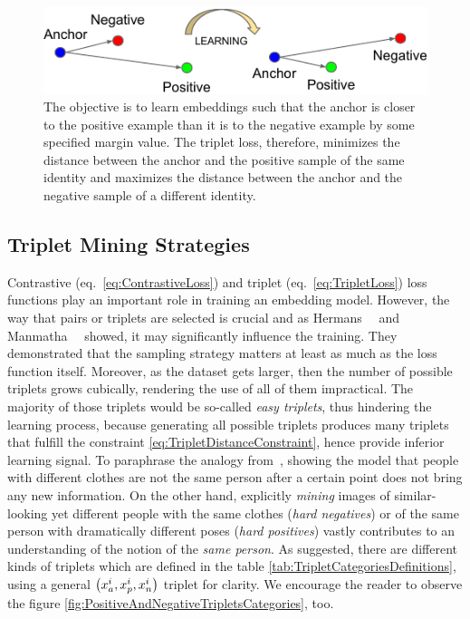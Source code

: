 \begin{figure}[t]
    \centerline{\includegraphics[width=0.6\linewidth]{figures/theoretical_foundations/triplet_loss_learning_process.pdf}}
    \caption[Triplet loss learning]{The objective is to learn embeddings such that the anchor is closer to the positive example than it is to the negative example by some specified margin value. The triplet loss, therefore, minimizes the distance between the anchor and the positive sample of the same identity and maximizes the distance between the anchor and the negative sample of a different identity. }
    \label{fig:TripletLossLearningProcess}
\end{figure}

\subsection{Triplet Mining Strategies}
\label{ssec:TripletMiningStrategies}

Contrastive (eq.~\ref{eq:ContrastiveLoss}) and triplet (eq.~\ref{eq:TripletLoss}) loss functions play an important role in training an embedding model. However, the way that pairs or triplets are selected is crucial and as Hermans~\etal{}~\cite{hermans2017triplet} and Manmatha~\etal{}~\cite{manmatha2017samplingmatters} showed, it may significantly influence the training. They demonstrated that the sampling strategy matters at least as much as the loss function itself. Moreover, as the dataset gets larger, then the number of possible triplets grows cubically, rendering the use of all of them impractical. The majority of those triplets would be so-called \emph{easy triplets}, thus hindering the learning process, because generating all possible triplets produces many triplets that fulfill the constraint \ref{eq:TripletDistanceConstraint}, hence provide inferior learning signal. To paraphrase the analogy from~\cite{hermans2017triplet}, showing the model that people with different clothes are not the same person after a certain point does not bring any new information. On the other hand, explicitly \emph{mining} images of similar-looking yet different people with the same clothes (\emph{hard negatives}) or of the same person with dramatically different poses (\emph{hard positives}) vastly contributes to an understanding of the notion of the \emph{same person}. As suggested, there are different kinds of triplets which are defined in the table \ref{tab:TripletCategoriesDefinitions}, using a general $\left( {x_a^i, x_p^i, x_n^i} \right)$ triplet for clarity. We encourage the reader to observe the figure \ref{fig:PositiveAndNegativeTripletsCategories}, too.

